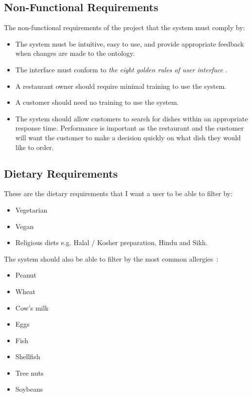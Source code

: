 \subsection{Non-Functional Requirements}

The non-functional requirements of the project that the system must comply by:

\begin{itemize}
\item The system must be intuitive, easy to use, and provide appropriate feedback when changes are made to the ontology.
\item The interface must conform to \textit{the eight golden rules of user interface} \cite{shneiderman}.
\item A restaurant owner should require minimal training to use the system.
\item A customer should need no training to use the system.
\item The system should allow customers to search for dishes within an appropriate response time. Performance is important as the restaurant and the customer will want the customer to make a decision quickly on what dish they would like to order.
\end{itemize}

\subsection{Dietary Requirements}

These are the dietary requirements that I want a user to be able to filter by:

\begin{itemize}
\item Vegetarian
\item Vegan
\item Religious diets e.g. Halal / Kosher preparation, Hindu and Sikh.
\end{itemize}

The system should also be able to filter by the most common allergies~\cite{burks2001food}:

\begin{itemize}
\item Peanut
\item Wheat
\item Cow's milk
\item Eggs
\item Fish
\item Shellfish
\item Tree nuts
\item Soybeans
\end{itemize}

